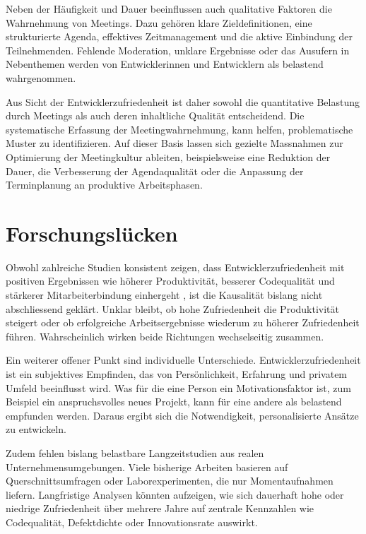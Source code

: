 \documentclass[12pt,a4paper]{report}
\begin{document}
    Neben der Häufigkeit und Dauer beeinflussen auch qualitative Faktoren die Wahrnehmung von Meetings. Dazu gehören klare
    Zieldefinitionen, eine strukturierte Agenda, effektives Zeitmanagement und die aktive Einbindung der Teilnehmenden.
    Fehlende Moderation, unklare Ergebnisse oder das Ausufern in Nebenthemen werden von Entwicklerinnen und Entwicklern
    als belastend wahrgenommen.

    Aus Sicht der Entwicklerzufriedenheit ist daher sowohl die quantitative Belastung durch Meetings als auch deren
    inhaltliche Qualität entscheidend. Die systematische Erfassung der Meetingwahrnehmung, kann helfen, problematische
    Muster zu identifizieren. Auf dieser Basis lassen sich gezielte Massnahmen
    zur Optimierung der Meetingkultur ableiten, beispielsweise eine Reduktion der Dauer, die Verbesserung der Agendaqualität
    oder die Anpassung der Terminplanung an produktive Arbeitsphasen.


\section{Forschungslücken}

Obwohl zahlreiche Studien konsistent zeigen, dass Entwicklerzufriedenheit mit positiven Ergebnissen wie höherer Produktivität,
besserer Codequalität und stärkerer Mitarbeiterbindung einhergeht \cite{graziotin_what_2018, sadowksi_happiness_2019}, ist die
Kausalität bislang nicht abschliessend geklärt. Unklar bleibt, ob hohe Zufriedenheit die Produktivität steigert oder ob
erfolgreiche Arbeitsergebnisse wiederum zu höherer Zufriedenheit führen. Wahrscheinlich wirken beide Richtungen wechselseitig
zusammen.

Ein weiterer offener Punkt sind individuelle Unterschiede. Entwicklerzufriedenheit ist ein subjektives Empfinden, das von
Persönlichkeit, Erfahrung und privatem Umfeld beeinflusst wird. Was für die eine Person ein Motivationsfaktor ist, zum Beispiel 
ein anspruchsvolles neues Projekt, kann für eine andere als belastend empfunden werden. Daraus ergibt sich die Notwendigkeit,
personalisierte Ansätze zu entwickeln.

Zudem fehlen bislang belastbare Langzeitstudien aus realen Unternehmensumgebungen. Viele bisherige Arbeiten basieren auf
Querschnittsumfragen oder Laborexperimenten, die nur Momentaufnahmen liefern. Langfristige Analysen könnten aufzeigen, wie sich
dauerhaft hohe oder niedrige Zufriedenheit über mehrere Jahre auf zentrale Kennzahlen wie Codequalität, Defektdichte oder
Innovationsrate auswirkt. 
\end{document}
